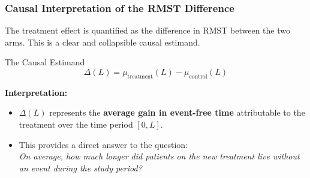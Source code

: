 \documentclass{beamer}
\begin{document}
\begin{frame}
\frametitle{Causal Interpretation of the RMST Difference}
The treatment effect is quantified as the difference in RMST between the two arms. This is a clear and collapsible causal estimand.

\begin{block}{The Causal Estimand}
$$\Delta(L) = \mu_{\text{treatment}}(L) - \mu_{\text{control}}(L)$$
\end{block}

\textbf{Interpretation:}
\begin{itemize}
    \item $\Delta(L)$ represents the \textbf{average gain in event-free time} attributable to the treatment over the time period $[0, L]$.
    \item This provides a direct answer to the question:
    \\
    \textit{On average, how much longer did patients on the new treatment live without an event during the study period?}
\end{itemize}
\end{frame}
\end{document}
